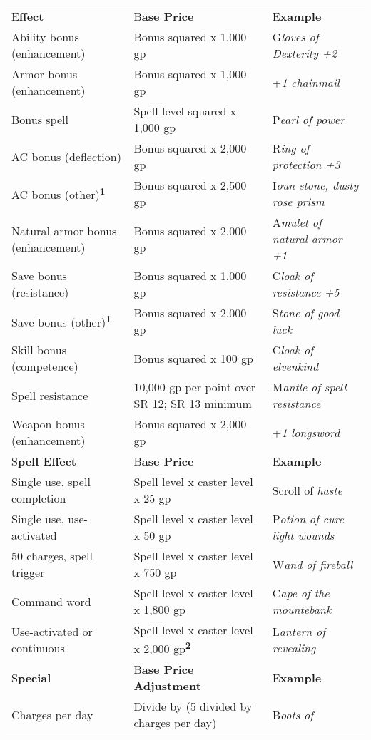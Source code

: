 \documentclass{article}
\begin{document}
\vspace{12pt}
\begin{tabular}{|>{\raggedright}p{109pt}|>{\raggedright}p{117pt}|>{\raggedright}p{87pt}|}
\hline
\multicolumn{3}{|p{314pt}|}{T\textbf{able: Estimating Magic Item Gold Piece Values}}\tabularnewline
\hline
E\textbf{ffect } & B\textbf{ase Price } & E\textbf{xample}\tabularnewline
\hline
Ability bonus (enhancement)  & Bonus squared  x 1,000 gp  & G\textit{loves of Dexterity 
+2}\tabularnewline
\hline
Armor bonus (enhancement)  & Bonus squared  x 1,000 gp  & +\textit{1 chainmail}\tabularnewline
\hline
Bonus spell  & Spell level squared  x 1,000 gp  & P\textit{earl of power}\tabularnewline
\hline
AC bonus (deflection)  & Bonus squared  x 2,000 gp  & R\textit{ing of protection 
+3}\tabularnewline
\hline
AC bonus (other)\textsuperscript{\textbf{1}}\textbf{ } & Bonus squared  x 2,500 
gp  & I\textit{oun stone, dusty rose prism}\tabularnewline
\hline
Natural armor bonus (enhancement)  & Bonus squared  x 2,000 gp  & A\textit{mulet 
of natural armor +1}\tabularnewline
\hline
Save bonus (resistance)  & Bonus squared  x 1,000 gp  & C\textit{loak of resistance 
+5}\tabularnewline
\hline
Save bonus (other)\textsuperscript{\textbf{1}}\textbf{ } & Bonus squared  x 2,000 
gp  & S\textit{tone of good luck}\tabularnewline
\hline
Skill bonus (competence)  & Bonus squared  x 100 gp  & C\textit{loak of elvenkind}\tabularnewline
\hline
Spell resistance  & 10,000 gp per point over SR 12; \linebreak{}
SR 13 minimum  & M\textit{antle of spell resistance}\tabularnewline
\hline
Weapon bonus (enhancement)  & Bonus squared  x 2,000 gp  & +\textit{1 longsword}\tabularnewline
\hline
S\textbf{pell Effect } & B\textbf{ase Price } & E\textbf{xample}\tabularnewline
\hline
Single use, spell completion  & Spell level  x caster level  x 25 gp  & Scroll 
of \textit{haste}\tabularnewline
\hline
Single use, use-activated  & Spell level  x caster level  x 50 gp  & P\textit{otion 
of cure light wounds}\tabularnewline
\hline
50 charges, spell trigger  & Spell level  x caster level  x 750 gp  & W\textit{and 
of fireball}\tabularnewline
\hline
Command word  & Spell level  x caster level  x 1,800 gp  & C\textit{ape of the 
mountebank}\tabularnewline
\hline
Use-activated or continuous  & Spell level  x caster level  x 2,000 gp\textsuperscript{\textbf{2}}\textbf{ 
} & L\textit{antern of revealing}\tabularnewline
\hline
S\textbf{pecial } & B\textbf{ase Price Adjustment } & E\textbf{xample}\tabularnewline
\hline
Charges per day  & Divide by (5 divided by charges per day)  & B\textit{oots of 
}
\end{tabular}
\end{document}
